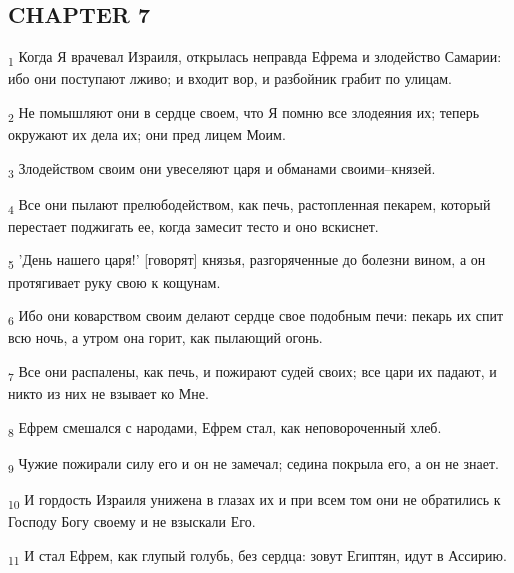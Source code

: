 \subsection{CHAPTER 7}
\begin{tcolorbox}
\textsubscript{1} Когда Я врачевал Израиля, открылась неправда Ефрема и злодейство Самарии: ибо они поступают лживо; и входит вор, и разбойник грабит по улицам.
\end{tcolorbox}
\begin{tcolorbox}
\textsubscript{2} Не помышляют они в сердце своем, что Я помню все злодеяния их; теперь окружают их дела их; они пред лицем Моим.
\end{tcolorbox}
\begin{tcolorbox}
\textsubscript{3} Злодейством своим они увеселяют царя и обманами своими--князей.
\end{tcolorbox}
\begin{tcolorbox}
\textsubscript{4} Все они пылают прелюбодейством, как печь, растопленная пекарем, который перестает поджигать ее, когда замесит тесто и оно вскиснет.
\end{tcolorbox}
\begin{tcolorbox}
\textsubscript{5} 'День нашего царя!' [говорят] князья, разгоряченные до болезни вином, а он протягивает руку свою к кощунам.
\end{tcolorbox}
\begin{tcolorbox}
\textsubscript{6} Ибо они коварством своим делают сердце свое подобным печи: пекарь их спит всю ночь, а утром она горит, как пылающий огонь.
\end{tcolorbox}
\begin{tcolorbox}
\textsubscript{7} Все они распалены, как печь, и пожирают судей своих; все цари их падают, и никто из них не взывает ко Мне.
\end{tcolorbox}
\begin{tcolorbox}
\textsubscript{8} Ефрем смешался с народами, Ефрем стал, как неповороченный хлеб.
\end{tcolorbox}
\begin{tcolorbox}
\textsubscript{9} Чужие пожирали силу его и он не замечал; седина покрыла его, а он не знает.
\end{tcolorbox}
\begin{tcolorbox}
\textsubscript{10} И гордость Израиля унижена в глазах их и при всем том они не обратились к Господу Богу своему и не взыскали Его.
\end{tcolorbox}
\begin{tcolorbox}
\textsubscript{11} И стал Ефрем, как глупый голубь, без сердца: зовут Египтян, идут в Ассирию.
\end{tcolorbox}
